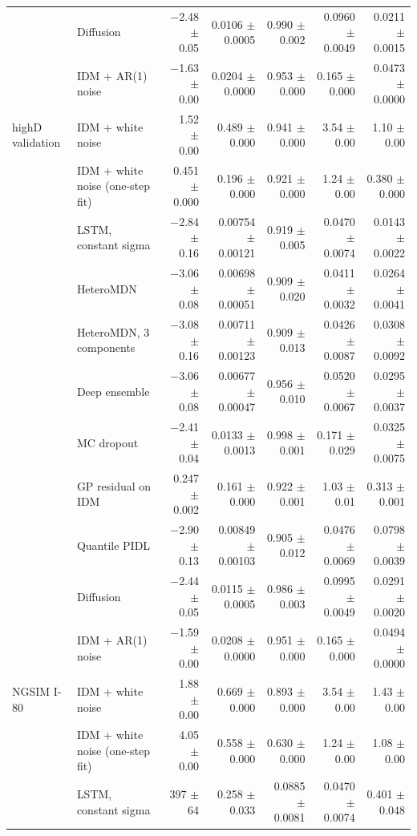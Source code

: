 \begin{longtable}{llrrrrr}
 & Diffusion & $-$2.48 $\pm$ 0.05 & 0.0106 $\pm$ 0.0005 & 0.990 $\pm$ 0.002 & 0.0960 $\pm$ 0.0049 & 0.0211 $\pm$ 0.0015 \\
 & IDM + AR(1) noise & $-$1.63 $\pm$ 0.00 & 0.0204 $\pm$ 0.0000 & 0.953 $\pm$ 0.000 & 0.165 $\pm$ 0.000 & 0.0473 $\pm$ 0.0000 \\
\midrule
highD validation & IDM + white noise & 1.52 $\pm$ 0.00 & 0.489 $\pm$ 0.000 & 0.941 $\pm$ 0.000 & 3.54 $\pm$ 0.00 & 1.10 $\pm$ 0.00 \\
 & IDM + white noise (one-step fit) & 0.451 $\pm$ 0.000 & 0.196 $\pm$ 0.000 & 0.921 $\pm$ 0.000 & 1.24 $\pm$ 0.00 & 0.380 $\pm$ 0.000 \\
 & LSTM, constant sigma & $-$2.84 $\pm$ 0.16 & 0.00754 $\pm$ 0.00121 & 0.919 $\pm$ 0.005 & 0.0470 $\pm$ 0.0074 & 0.0143 $\pm$ 0.0022 \\
 & HeteroMDN & $-$3.06 $\pm$ 0.08 & 0.00698 $\pm$ 0.00051 & 0.909 $\pm$ 0.020 & 0.0411 $\pm$ 0.0032 & 0.0264 $\pm$ 0.0041 \\
 & HeteroMDN, 3 components & $-$3.08 $\pm$ 0.16 & 0.00711 $\pm$ 0.00123 & 0.909 $\pm$ 0.013 & 0.0426 $\pm$ 0.0087 & 0.0308 $\pm$ 0.0092 \\
 & Deep ensemble & $-$3.06 $\pm$ 0.08 & 0.00677 $\pm$ 0.00047 & 0.956 $\pm$ 0.010 & 0.0520 $\pm$ 0.0067 & 0.0295 $\pm$ 0.0037 \\
 & MC dropout & $-$2.41 $\pm$ 0.04 & 0.0133 $\pm$ 0.0013 & 0.998 $\pm$ 0.001 & 0.171 $\pm$ 0.029 & 0.0325 $\pm$ 0.0075 \\
 & GP residual on IDM & 0.247 $\pm$ 0.002 & 0.161 $\pm$ 0.000 & 0.922 $\pm$ 0.001 & 1.03 $\pm$ 0.01 & 0.313 $\pm$ 0.001 \\
 & Quantile PIDL & $-$2.90 $\pm$ 0.13 & 0.00849 $\pm$ 0.00103 & 0.905 $\pm$ 0.012 & 0.0476 $\pm$ 0.0069 & 0.0798 $\pm$ 0.0039 \\
 & Diffusion & $-$2.44 $\pm$ 0.05 & 0.0115 $\pm$ 0.0005 & 0.986 $\pm$ 0.003 & 0.0995 $\pm$ 0.0049 & 0.0291 $\pm$ 0.0020 \\
 & IDM + AR(1) noise & $-$1.59 $\pm$ 0.00 & 0.0208 $\pm$ 0.0000 & 0.951 $\pm$ 0.000 & 0.165 $\pm$ 0.000 & 0.0494 $\pm$ 0.0000 \\
\midrule
NGSIM I-80 & IDM + white noise & 1.88 $\pm$ 0.00 & 0.669 $\pm$ 0.000 & 0.893 $\pm$ 0.000 & 3.54 $\pm$ 0.00 & 1.43 $\pm$ 0.00 \\
 & IDM + white noise (one-step fit) & 4.05 $\pm$ 0.00 & 0.558 $\pm$ 0.000 & 0.630 $\pm$ 0.000 & 1.24 $\pm$ 0.00 & 1.08 $\pm$ 0.00 \\
 & LSTM, constant sigma & 397 $\pm$ 64 & 0.258 $\pm$ 0.033 & 0.0885 $\pm$ 0.0081 & 0.0470 $\pm$ 0.0074 & 0.401 $\pm$ 0.048 \\

\end{longtable}
